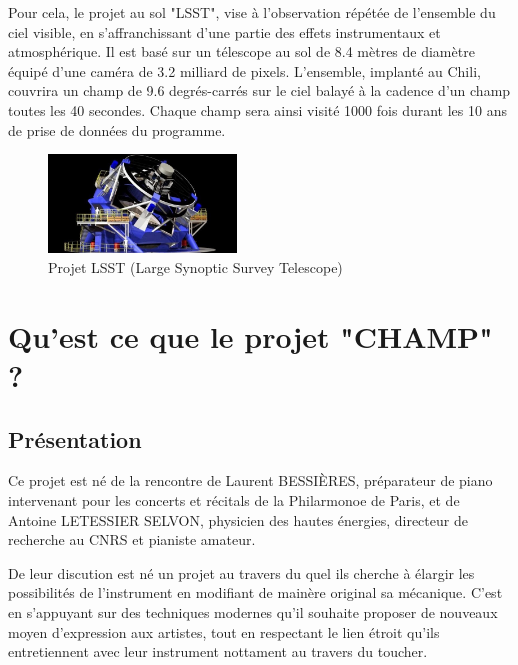 \documentclass[french,a4paper,12pt]{report}
\begin{document}
\begin{itemize}
  Pour cela, le projet au sol "LSST", vise à l'observation répétée de l'ensemble du ciel visible, en s'affranchissant d'une partie des effets instrumentaux et atmosphérique. Il est basé sur un télescope au sol de 8.4 mètres de diamètre équipé d'une caméra de 3.2 milliard de pixels. L'ensemble, implanté au Chili, couvrira un champ de 9.6 degrés-carrés sur le ciel balayé à la cadence d'un champ toutes les 40 secondes. Chaque champ sera ainsi visité 1000 fois durant les 10 ans de prise de données du programme.\newline
    	
	\begin{figure}[!ht]
    \center
    \includegraphics[width=5cm]{lsst.jpg}
    \caption{Projet LSST (Large Synoptic Survey Telescope)}
	\end{figure} 
		  	
  \end{itemize}
  
    
%
%
\part{Qu'est ce que le projet "CHAMP" ?}
  \chapter{Présentation}
  
  Ce projet est né de la rencontre de Laurent BESSIÈRES, préparateur de piano intervenant pour les concerts et récitals de la Philarmonoe de Paris, et de Antoine LETESSIER SELVON, physicien des hautes énergies, directeur de recherche au CNRS et pianiste amateur. 
  
  De leur discution est né un projet au travers du quel ils cherche à élargir les possibilités de l'instrument en modifiant de mainère original sa mécanique. C'est en s'appuyant sur des techniques modernes qu'il souhaite proposer de nouveaux moyen d'expression aux artistes, tout en respectant le lien étroit qu'ils entretiennent avec leur instrument nottament au travers du toucher.
  
\end{document}
